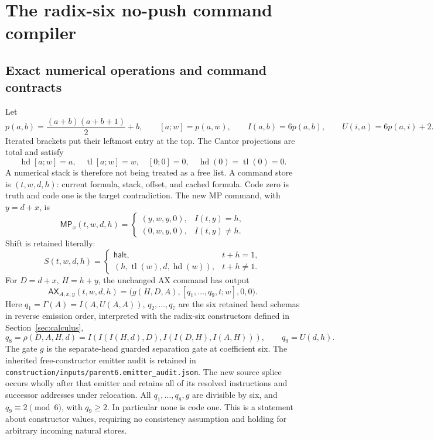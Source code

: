 \section{The radix-six no-push command compiler}
\label{sec:np-controller}\label{sec:commands}

\subsection{Exact numerical operations and command contracts}

Let
\[
 p(a,b)=\frac{(a+b)(a+b+1)}2+b,\qquad [a;w]=p(a,w),\qquad
 I(a,b)=6p(a,b),\qquad U(i,a)=6p(a,i)+2.
\]
Iterated brackets put their leftmost entry at the top. The Cantor
projections are total and satisfy
\[
 \operatorname{hd}[a;w]=a,\quad \operatorname{tl}[a;w]=w,
 \quad[0;0]=0,\quad\operatorname{hd}(0)=\operatorname{tl}(0)=0.
\]
A numerical stack is therefore not being treated as a free list.
A command store is $(t,w,d,h)$: current formula, stack, offset, and cached
formula. Code zero is truth and code one is the target contradiction.
The new MP command, with $y=d+x$, is
\begin{equation}\label{eq:np-mp}
 \mathsf{MP}_x(t,w,d,h)=
 \begin{cases}
 (y,w,y,0),& I(t,y)=h,\\
 (0,w,y,0),& I(t,y)\ne h.
 \end{cases}
\end{equation}
Shift is retained literally:
\begin{equation}\label{eq:np-shift}
 S(t,w,d,h)=
 \begin{cases}
 \mathsf{halt},&t+h=1,\\
 (h,\operatorname{tl}(w),d,\operatorname{hd}(w)),&t+h\ne1.
 \end{cases}
\end{equation}
For $D=d+x$, $H=h+y$, the unchanged AX command has output
\begin{equation}\label{eq:np-ax}
 \mathsf{AX}_{A,x,y}(t,w,d,h)
   =\bigl(g(H,D,A),[q_1,\ldots,q_9,t;w],0,0\bigr).
\end{equation}
Here $q_1=\Gamma(A)=I(A,U(A,A))$, $q_2,\ldots,q_7$ are the
six retained head schemas in reverse emission order, interpreted with
the radix-six constructors defined in Section~\ref{sec:calculus},
\[
 q_8=\rho(D,A,H,d)=I(I(I(H,d),D),I(I(D,H),I(A,H))),
 \qquad q_9=U(d,h).
\]
The gate $g$ is the separate-head guarded separation gate at coefficient six.
The inherited free-constructor emitter audit is retained in
\texttt{construction/inputs/parent6.emitter\_audit.json}.
The new source splice occurs wholly after that emitter and retains all
of its resolved instructions and successor addresses under relocation. All $q_1,\ldots,q_8,g$ are divisible by six,
and $q_9\equiv2\pmod6$, with $q_9\ge2$. In particular none is code one.
This is a statement about constructor values, requiring no consistency
assumption and holding for arbitrary incoming natural stores.

